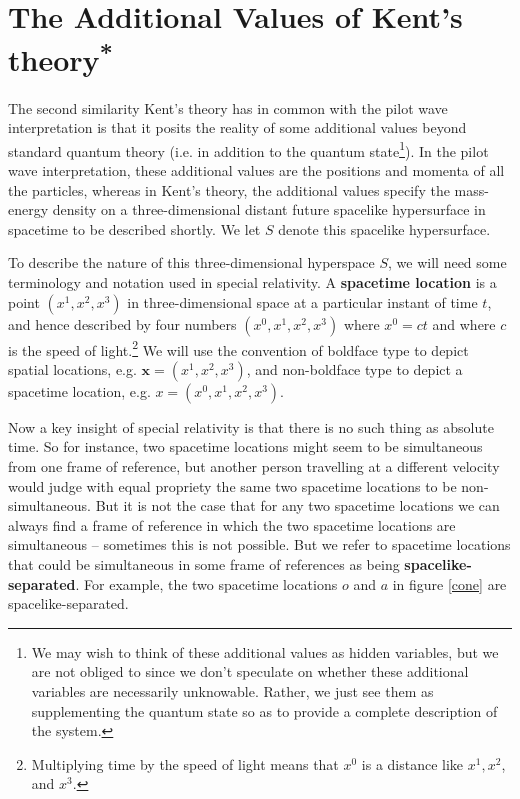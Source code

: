 \section{The Additional Values of Kent's theory\textsuperscript{*}\label{additional}}
The second similarity Kent's theory has in common with the pilot wave interpretation is that it posits the reality of some additional values beyond standard quantum theory (i.e. in addition to the quantum state\footnote{We may wish to think of these additional values as hidden variables, but we are not obliged to since we don't speculate on whether these additional variables are necessarily unknowable. Rather, we just see them as supplementing the quantum state so as to provide a complete description of the system.}). In the pilot wave interpretation, these additional values are the positions and momenta of all the particles, whereas in Kent's theory, the additional values specify the mass-energy density on a three-dimensional distant future spacelike hypersurface in spacetime to be described shortly. We let $S$ denote this spacelike hypersurface.

To describe the nature of this three-dimensional hyperspace $S$, we will need some terminology and notation used in special relativity. A \textbf{spacetime location} is a point $(x^1,x^2,x^3)$ in three-dimensional space at a particular instant of time $t$, and hence described by four numbers $(x^0,x^1,x^2,x^3)$ where $x^0=c t$ and where $c$ is the speed of light.\footnote{Multiplying time by the speed of light means that $x^0$ is a distance like $x^1,x^2$, and $x^3$. } We will use the convention of boldface type to depict spatial locations, e.g. $\bm{x}=(x^1,x^2,x^3)$, and non-boldface type to depict a spacetime location, e.g. $x=(x^0,x^1,x^2,x^3)$. 

Now a key insight of special relativity is that there is no such thing as absolute time. So for instance, two spacetime locations might seem to be simultaneous from one frame of reference, but another person travelling at a different velocity would judge with equal propriety the same two spacetime locations to be non-simultaneous. But it is not the case that for any two spacetime locations we can always find a frame of reference in which the two spacetime locations are simultaneous -- sometimes this is not possible. But we refer to spacetime locations that could be simultaneous in some frame of references as being \textbf{spacelike-separated}. For example, the two spacetime locations $o$ and $a           $  in figure \ref{cone} are spacelike-separated. 


